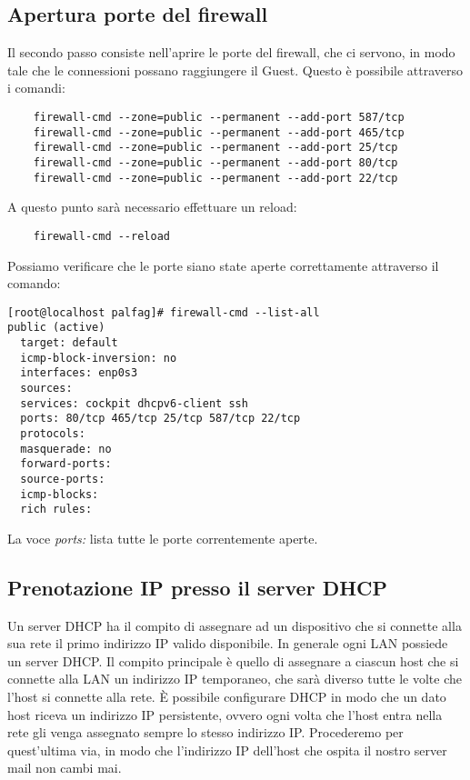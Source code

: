 \subsection{Apertura porte del firewall}

Il secondo passo consiste nell’aprire le porte del firewall, che ci servono, in modo tale che le connessioni 
possano raggiungere il Guest. Questo è possibile attraverso i comandi:

\begin{verbatim}
    firewall-cmd --zone=public --permanent --add-port 587/tcp
    firewall-cmd --zone=public --permanent --add-port 465/tcp
    firewall-cmd --zone=public --permanent --add-port 25/tcp
    firewall-cmd --zone=public --permanent --add-port 80/tcp
    firewall-cmd --zone=public --permanent --add-port 22/tcp
\end{verbatim}

A questo punto sarà necessario effettuare un reload:

\begin{verbatim}
    firewall-cmd --reload
\end{verbatim}

Possiamo verificare che le porte siano state aperte correttamente attraverso il comando:
\begin{verbatim}
[root@localhost palfag]# firewall-cmd --list-all
public (active)
  target: default
  icmp-block-inversion: no
  interfaces: enp0s3
  sources: 
  services: cockpit dhcpv6-client ssh
  ports: 80/tcp 465/tcp 25/tcp 587/tcp 22/tcp
  protocols: 
  masquerade: no
  forward-ports: 
  source-ports: 
  icmp-blocks: 
  rich rules: 
\end{verbatim}

La voce \textit{ports:} lista tutte le porte correntemente aperte.

\subsection{Prenotazione IP presso il server DHCP}
Un server DHCP ha il compito di assegnare ad un dispositivo che si connette alla sua rete il primo indirizzo IP 
valido disponibile. In generale ogni LAN possiede un server DHCP. 
Il compito principale è quello di assegnare a ciascun host che si connette alla LAN un indirizzo IP temporaneo, 
che sarà diverso tutte le volte che l’host si connette alla rete. 
È possibile configurare DHCP in modo che un dato host riceva un indirizzo IP persistente, 
ovvero ogni volta che l’host entra nella rete gli venga assegnato sempre lo stesso indirizzo IP. 
Procederemo per quest’ultima via, in modo che l’indirizzo IP dell’host che ospita il nostro server mail non cambi mai.

